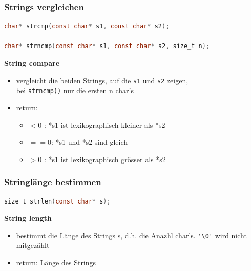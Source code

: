 		\subsubsection{Strings vergleichen}
			\begin{lstlisting}[language=C]
char* strcmp(const char* s1, const char* s2);

char* strncmp(const char* s1, const char* s2, size_t n);
			\end{lstlisting}
			\textbf{String compare}
				\begin{itemize}
					\item vergleicht die beiden Strings, auf die \verb|s1| und \verb|s2| zeigen,\\
					bei \verb|strncmp()| nur die ersten n char's
					\item return:
					\begin{itemize}
						\item $<0$ : *s1 ist lexikographisch kleiner als *s2
						\item $==0$: *s1 und *s2 sind gleich
						\item $>0$ : *s1 ist lexikographisch grösser als *s2
					\end{itemize}
				\end{itemize}
		\subsubsection{Stringlänge bestimmen}
			\begin{lstlisting}[language=C]
size_t strlen(const char* s);
			\end{lstlisting}
			\textbf{String length}
				\begin{itemize}
					\item bestimmt die Länge des Strings s, d.h. die Anazhl char's. \verb|'\0'| wird nicht mitgezählt 
					\item return: Länge des Strings
				\end{itemize}
